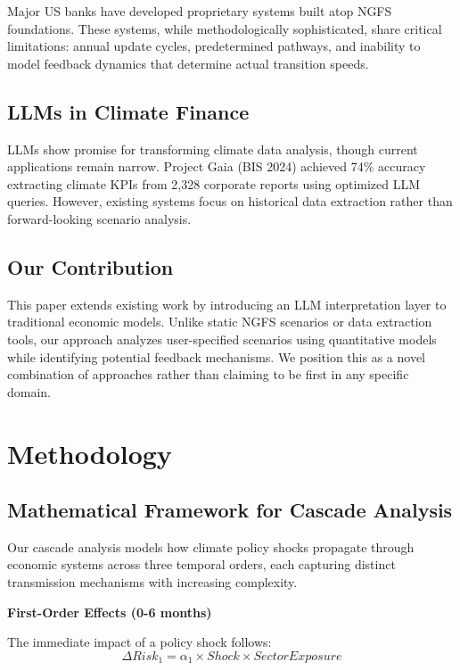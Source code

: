 \documentclass[conference]{IEEEtran}
\begin{document}
Major US banks have developed proprietary systems built atop NGFS foundations. These systems, while methodologically sophisticated, share critical limitations: annual update cycles, predetermined pathways, and inability to model feedback dynamics that determine actual transition speeds.

\subsection{LLMs in Climate Finance}

LLMs show promise for transforming climate data analysis, though current applications remain narrow. Project Gaia (BIS 2024) achieved 74\% accuracy extracting climate KPIs from 2,328 corporate reports using optimized LLM queries. However, existing systems focus on historical data extraction rather than forward-looking scenario analysis.

\subsection{Our Contribution}

This paper extends existing work by introducing an LLM interpretation layer to traditional economic models. Unlike static NGFS scenarios or data extraction tools, our approach analyzes user-specified scenarios using quantitative models while identifying potential feedback mechanisms. We position this as a novel combination of approaches rather than claiming to be first in any specific domain.

\section{Methodology}

\subsection{Mathematical Framework for Cascade Analysis}

Our cascade analysis models how climate policy shocks propagate through economic systems across three temporal orders, each capturing distinct transmission mechanisms with increasing complexity.

\textbf{First-Order Effects (0-6 months)}

The immediate impact of a policy shock follows:
\begin{equation}
\Delta Risk_1 = \alpha_1 \times Shock \times SectorExposure
\end{equation}
\end{document}
